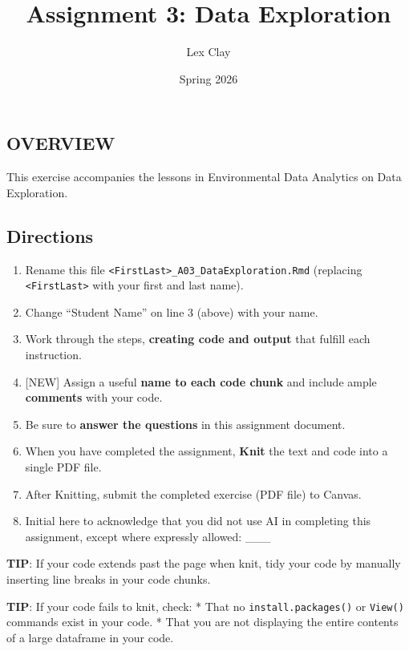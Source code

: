 \documentclass[
]{article}
\title{Assignment 3: Data Exploration}
\author{Lex Clay}
\date{Spring 2026}
\begin{document}
\maketitle

\subsection{OVERVIEW}\label{overview}

This exercise accompanies the lessons in Environmental Data Analytics on
Data Exploration.

\subsection{Directions}\label{directions}

\begin{enumerate}
\def\labelenumi{\arabic{enumi}.}
\item
  Rename this file
  \texttt{\textless{}FirstLast\textgreater{}\_A03\_DataExploration.Rmd}
  (replacing \texttt{\textless{}FirstLast\textgreater{}} with your first
  and last name).
\item
  Change ``Student Name'' on line 3 (above) with your name.
\item
  Work through the steps, \textbf{creating code and output} that fulfill
  each instruction.
\item
  {[}NEW{]} Assign a useful \textbf{name to each code chunk} and include
  ample \textbf{comments} with your code.
\item
  Be sure to \textbf{answer the questions} in this assignment document.
\item
  When you have completed the assignment, \textbf{Knit} the text and
  code into a single PDF file.
\item
  After Knitting, submit the completed exercise (PDF file) to Canvas.
\item
  Initial here to acknowledge that you did not use AI in completing this
  assignment, except where expressly allowed: \_\_\_
\end{enumerate}

\textbf{TIP}: If your code extends past the page when knit, tidy your
code by manually inserting line breaks in your code chunks.

\textbf{TIP}: If your code fails to knit, check: * That no
\texttt{install.packages()} or \texttt{View()} commands exist in your
code. * That you are not displaying the entire contents of a large
dataframe in your code.
\end{document}

